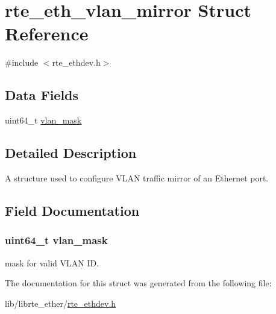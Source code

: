 \hypertarget{structrte__eth__vlan__mirror}{}\section{rte\+\_\+eth\+\_\+vlan\+\_\+mirror Struct Reference}
\label{structrte__eth__vlan__mirror}


{\ttfamily \#include $<$rte\+\_\+ethdev.\+h$>$}

\subsection*{Data Fields}
\begin{DoxyCompactItemize}
\item 
uint64\+\_\+t \hyperlink{structrte__eth__vlan__mirror_a0909afcac1ef929f577049760fc0509a}{vlan\+\_\+mask}
\end{DoxyCompactItemize}


\subsection{Detailed Description}
A structure used to configure V\+L\+A\+N traffic mirror of an Ethernet port. 

\subsection{Field Documentation}
\hypertarget{structrte__eth__vlan__mirror_a0909afcac1ef929f577049760fc0509a}{}
\subsubsection[{vlan\+\_\+mask}]{\setlength{\rightskip}{0pt plus 5cm}uint64\+\_\+t vlan\+\_\+mask}\label{structrte__eth__vlan__mirror_a0909afcac1ef929f577049760fc0509a}
mask for valid V\+L\+A\+N I\+D. 

The documentation for this struct was generated from the following file\+:\begin{DoxyCompactItemize}
\item 
lib/librte\+\_\+ether/\hyperlink{rte__ethdev_8h}{rte\+\_\+ethdev.\+h}\end{DoxyCompactItemize}
